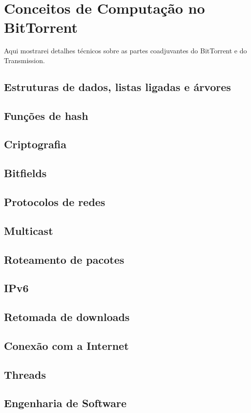 
\chapter{Conceitos de Computação no BitTorrent}

Aqui mostrarei detalhes técnicos sobre as partes coadjuvantes do BitTorrent e do Transmission.


\section{Estruturas de dados, listas ligadas e árvores}
\section{Funções de hash} %
\section{Criptografia} %
\section{Bitfields}
\section{Protocolos de redes} %
\section{Multicast}
\section{Roteamento de pacotes} %
\section{IPv6}
\section{Retomada de downloads}
\section{Conexão com a Internet}
\section{Threads}
\section{Engenharia de Software}

\afterpage{\clearpage}
